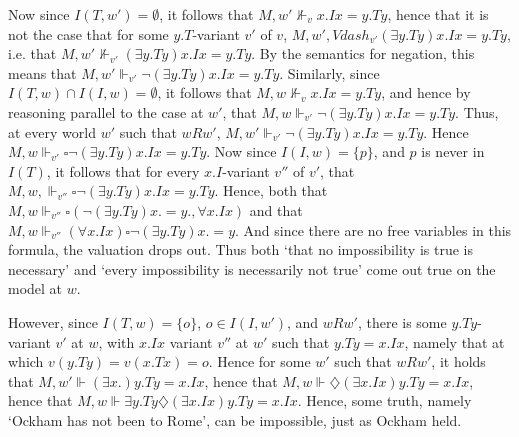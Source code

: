 \documentclass[a4paper]{article}
\begin{document}
Now since $I(T, w') = \emptyset$, it follows that $M, w' \nVdash_{v} x.Ix = y.Ty$, hence that it is not the case that for some $y.T$-variant $v'$ of $v$, $M, w', Vdash_{v'} (\exists y.Ty)x.Ix = y.Ty$, i.e. that $M, w' \nVdash_{v'} (\exists y.Ty)x.Ix = y.Ty$. By the semantics for negation, this means that $M, w' \Vdash_{v'} \neg(\exists y.Ty)x.Ix = y.Ty$. Similarly, since $I(T, w) \cap I(I, w) = \emptyset$, it follows that $M, w \nVdash_{v} x.Ix = y.Ty$, and hence by  reasoning parallel to the case at $w'$, that $M, w \Vdash_{v'} \neg(\exists y.Ty)x.Ix = y.Ty$. Thus, at every world $w'$ such that $wRw'$, $M, w' \Vdash_{v'} \neg(\exists y.Ty)x.Ix=y.Ty$. Hence $M, w \Vdash_{v'} \square \neg(\exists y.Ty)x.Ix=y.Ty$. Now since $I(I, w) = \{p\}$, and $p$ is never in $I(T)$, it follows that for every $x.I$-variant $v''$ of $v'$, that $M, w, \Vdash_{v''} \square \neg (\exists y.Ty) x.Ix = y.Ty$. Hence, both that $M, w \Vdash_{v''} \square(\neg(\exists y.Ty)x.=y., \forall x.Ix)$ and that $M, w \Vdash_{v''} (\forall x.Ix) \square \neg (\exists y.Ty) x.=y.$ And since there are no free variables in this formula, the valuation drops out. Thus both `that no impossibility is true is necessary' and `every impossibility is necessarily not true' come out true on the model at $w$. 

However, since $I(T, w) = \{o\}$, $o \in I(I, w')$, and $wRw'$, there is some $y.Ty$-variant $v'$ at $w$, with $x.Ix$ variant $v''$ at $w'$ such that $y.Ty = x.Ix$, namely that at which $v(y.Ty) = v(x.Tx) = o$. Hence for some $w'$ such that $wRw'$, it holds that $M, w' \Vdash (\exists x.)y.Ty = x.Ix$, hence that $M, w \Vdash \diamondsuit (\exists x.Ix)y.Ty = x.Ix$, hence that $M, w \Vdash \exists y.Ty \diamondsuit (\exists x.Ix)y.Ty = x.Ix$. Hence, some truth, namely `Ockham has not been to Rome', can be impossible, just as Ockham held. 
\end{document}
